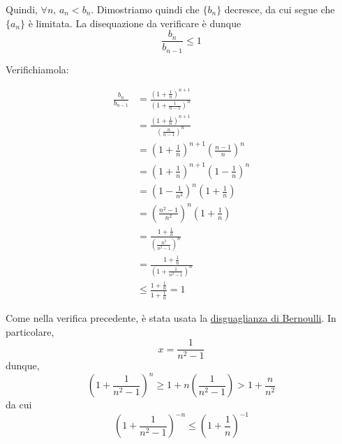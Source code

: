 \documentclass[../../analisi1]{subfiles}
\begin{document}
            Quindi, \(\forall n, \, a_n < b_n\). Dimostriamo quindi che \(\{b_n\}\) decresce, da cui segue che \(\{a_n\}\) è limitata.
            La disequazione da verificare è dunque
            \[
                \frac{b_n}{b_{n - 1}} \leqslant 1
            \]

            Verifichiamola:

            \medskip
            \begin{minipage}[t]{.55\textwidth}
                \vspace{-\baselineskip}
                
                \begin{align*}
                    \frac{b_n}{b_{n - 1}} &= \frac{{\left(1 + \frac{1}{n}\right)}^{n + 1}}{{\left(1 + \frac{1}{n - 1}\right)}^n}\\
                    &= \frac{{\left(1 + \frac{1}{n}\right)}^{n + 1}}{{\left(\frac{n}{n - 1}\right)}^n}\\
                    &= {\left(1 + \frac{1}{n}\right)}^{n + 1} {\left(\frac{n - 1}{n}\right)}^n\\
                    &= {\left(1 + \frac{1}{n}\right)}^{n + 1} {\left(1 - \frac{1}{n}\right)}^n\\
                    &= {\left(1 - \frac{1}{n^2}\right)}^n \left(1 + \frac{1}{n}\right)\\
                    &= {\left(\frac{n^2 - 1}{n^2}\right)}^n \left(1 + \frac{1}{n}\right)\\
                    &= \frac{1 + \frac{1}{n}}{{\left(\frac{n^2}{n^2 - 1}\right)}^n}\\
                    &= \frac{1 + \frac{1}{n}}{{\left(1 + \frac{1}{n^2 - 1}\right)}^n}\\
                    &\leqslant \frac{1 + \frac{1}{n}}{1 + \frac{1}{n}} = 1
                \end{align*}
            \end{minipage}
            \hfill
            \begin{minipage}[t]{.45\textwidth}
                \vspace{-\baselineskip}
                \vspace{15ex}

                \begin{framed}
                    Come nella verifica precedente, è stata usata la
                    \hyperref[disBernoulli]{disguaglianza di Bernoulli}.
                    In particolare,
                    \[
                        x = \frac{1}{n^2 - 1}
                    \]
                    dunque,
                    \[
                        {\left(1 + \frac{1}{n^2 - 1}\right)}^n \geqslant 1 + n \left(\frac{1}{n^2 - 1}\right) > 1 + \frac{n}{n^2}
                    \]
                    da cui
                    \[
                        {\left(1 + \frac{1}{n^2 - 1}\right)}^{-n} \leqslant {\left(1 + \frac{1}{n}\right)}^{-1}
                    \]
                \end{framed}
            \end{minipage}
        
\end{document}
